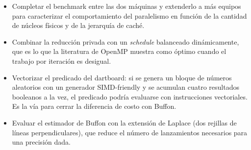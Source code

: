 \begin{itemize}
    \item Completar el benchmark entre las dos máquinas y extenderlo a más equipos para caracterizar el comportamiento del paralelismo en función de la cantidad de núcleos físicos y de la jerarquía de caché.
    \item Combinar la reducción privada con un \emph{schedule} balanceado dinámicamente, que es lo que la literatura de OpenMP muestra como óptimo cuando el trabajo por iteración es desigual.
    \item Vectorizar el predicado del dartboard: si se genera un bloque de números aleatorios con un generador SIMD-friendly y se acumulan cuatro resultados booleanos a la vez, el predicado podría evaluarse con instrucciones vectoriales. Es la vía para cerrar la diferencia de costo con Buffon.
    \item Evaluar el estimador de Buffon con la extensión de Laplace (dos rejillas de líneas perpendiculares), que reduce el número de lanzamientos necesarios para una precisión dada.
\end{itemize}
